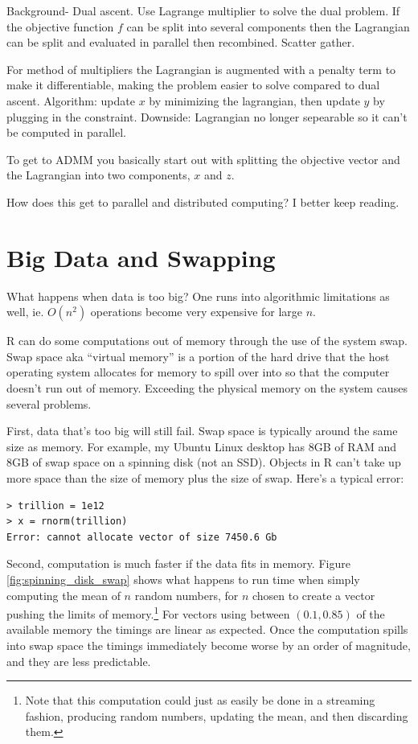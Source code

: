 \documentclass[12pt]{article}
\begin{document}
Background- Dual ascent. Use Lagrange multiplier to solve the dual problem.
If the objective function $f$ can be split into several components then the
Lagrangian can be split and evaluated in parallel then recombined. Scatter
gather.

For method of multipliers the Lagrangian is augmented with a penalty term
to make it differentiable, making the problem easier to solve compared to
dual ascent. Algorithm: update $x$ by minimizing the lagrangian, then
update $y$ by plugging in the constraint. Downside: Lagrangian no longer
sepearable so it can't be computed in parallel.

To get to ADMM you basically start out with splitting the objective vector
and the Lagrangian into two components, $x$ and $z$.

How does this get to parallel and distributed computing? I better keep
reading.

\section{Big Data and Swapping}

What happens when data is too big? One runs into algorithmic limitations as
well, ie. $O(n^2)$ operations become very expensive for large $n$.

R can do some computations out of memory through the use of the system
swap. Swap space aka ``virtual memory'' is a portion of the hard drive that
the host operating system allocates for memory to spill over into so that
the computer doesn't run out of memory.  Exceeding the physical memory on
the system causes several problems.

First, data that's too big will still fail. Swap space is typically
around the same size as memory. For example, my Ubuntu Linux desktop has
8GB of RAM and 8GB of swap space on a spinning disk (not an SSD). Objects
in R can't take up more space than the size of memory plus the size of
swap. Here's a typical error:

\begin{verbatim}
> trillion = 1e12
> x = rnorm(trillion)
Error: cannot allocate vector of size 7450.6 Gb
\end{verbatim}

Second, computation is much faster if the data fits in memory.
Figure \ref{fig:spinning_disk_swap} shows what happens to run time when
simply computing the mean of $n$ random numbers, for $n$ chosen to create a
vector pushing the limits of memory.\footnote{Note that this computation
could just as easily be done in a streaming fashion, producing random
numbers, updating the mean, and then discarding them.} For vectors using between $(0.1, 0.85)$
of the available memory the timings are linear as expected.
Once the computation spills into swap space the timings immediately become
worse by an order of magnitude, and they are less predictable.
\end{document}
